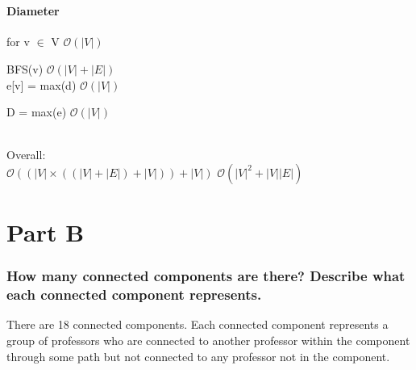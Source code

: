 \documentclass[]{article}
\begin{document}
\
  \begin{minipage}[t]{0.33\linewidth}
    \subsection{Diameter}
      \begin{adjustwidth}{2em}{0pt}
      for v $\in$ V \hfill $\mathcal{O} \left( |V| \right)$
      \begin{adjustwidth}{1em}{0pt}
        BFS(v) \hfill $\mathcal{O} \left( |V| + |E| \right)$\\
        e[v] = max(d) \hfill $\mathcal{O} \left( |V| \right)$
        \end{adjustwidth}
        D = max(e) \hfill $\mathcal{O} \left( |V| \right)$

      \ \\
      Overall: \\

      $ \mathcal{O} \left( \left(|V| \times \left( \left( |V| + |E| \right) + |V| \right) \right) + |V| \right)$
      $ \mathcal{O} \left( |V|^2 + |V||E| \right)$
    \end{adjustwidth}
  \end{minipage}

\part*{Part B}

  \section{How many connected components are there? Describe what each connected component represents.}

    There are 18 connected components. Each connected component represents a group of professors who are connected to another professor within the component through some path but not connected to any professor not in the component.
\end{document}
